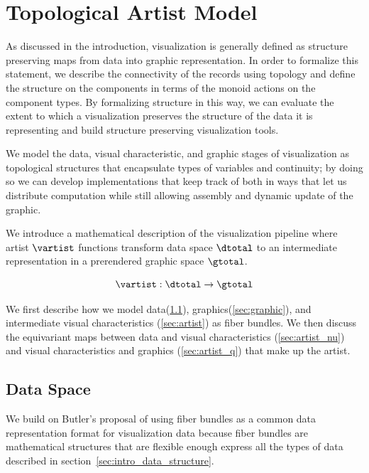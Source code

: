 \documentclass[../main.tex]{subfiles}
\begin{document}
\section{Topological Artist Model}
\label{sec:tam}


As discussed in the introduction, visualization is generally defined as structure preserving maps from data into graphic representation. In order to formalize this statement, we describe the connectivity of the records using topology and define the structure on the components in terms of the monoid actions on the component types. By formalizing structure in this way, we can evaluate the extent to which a visualization preserves the structure of the data it is representing and build structure preserving visualization tools. 


We model the data, visual characteristic, and graphic stages of visualization as topological structures that encapsulate types of variables and continuity; by doing so we can develop implementations that keep track of both in ways that let us distribute computation while still allowing assembly and dynamic update of the graphic. 

We introduce a mathematical description of the visualization pipeline where artist $\mathscr{\vartist}$ functions transform data space $\mathscr{\dtotal}$ to an intermediate representation in a prerendered graphic space $\mathscr{\gtotal}$.

\begin{equation}
    \label{eq:artist}
    \mathscr{\vartist}: \mathscr{\dtotal} \rightarrow \mathscr{\gtotal}
\end{equation}

We first describe how we model data(\ref{sec:data}), graphics(\ref{sec:graphic}), and intermediate visual characteristics (\ref{sec:artist}) as fiber bundles. We then discuss the equivariant maps between data and visual characteristics (\ref{sec:artist_nu}) and visual characteristics and graphics (\ref{sec:artist_q}) that make up the artist.

\subsection{Data Space \dtotal}
\label{sec:data}
We build on Butler's proposal of using fiber bundles as a common data representation format for visualization data\cite{butlerVectorBundleClassesForm1992, butlerVisualizationModelBased1989} because fiber bundles are mathematical structures that are flexible enough express all the types of data described in section~\ref{sec:intro_data_structure}.
\end{document}
